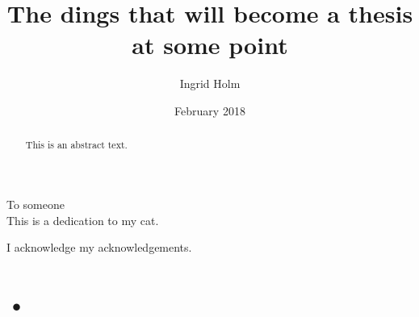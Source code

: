 \documentclass[twoside,english]{uiofysmaster}
\begin{document}
\title{The dings that will become a thesis at some point}
\author{Ingrid Holm}
\date{February 2018}

\maketitle

\begin{abstract}
This is an abstract text.
\end{abstract}

\begin{dedication}
  To someone
  \\\vspace{12pt}
  This is a dedication to my cat.
\end{dedication}

\begin{acknowledgements}
  I acknowledge my acknowledgements.
\end{acknowledgements}

\tableofcontents

\chapter{•}











\end{document}
